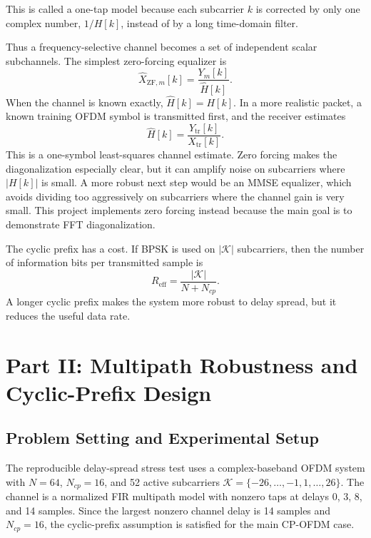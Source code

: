 \documentclass[conference]{IEEEtran}
\begin{document}
This is called a one-tap model because each subcarrier $k$ is corrected by only one complex number, $1/H[k]$, instead of by a long time-domain filter.

Thus a frequency-selective channel becomes a set of independent scalar subchannels. The simplest zero-forcing equalizer is
\begin{equation}
    \hat{X}_{\mathrm{ZF},m}[k]=\frac{Y_m[k]}{\hat{H}[k]}.
    \label{eq:zf}
\end{equation}
When the channel is known exactly, $\hat{H}[k]=H[k]$. In a more realistic packet, a known training OFDM symbol is transmitted first, and the receiver estimates
\begin{equation}
    \hat{H}[k]=\frac{Y_{\mathrm{tr}}[k]}{X_{\mathrm{tr}}[k]}.
    \label{eq:training}
\end{equation}
This is a one-symbol least-squares channel estimate. Zero forcing makes the diagonalization especially clear, but it can amplify noise on subcarriers where $|H[k]|$ is small. A more robust next step would be an MMSE equalizer, which avoids dividing too aggressively on subcarriers where the channel gain is very small. This project implements zero forcing instead because the main goal is to demonstrate FFT diagonalization. 

The cyclic prefix has a cost. If BPSK is used on $|\mathcal{K}|$ subcarriers, then the number of information bits per transmitted sample is
\begin{equation}
    R_{\mathrm{eff}}=\frac{|\mathcal{K}|}{N+N_{cp}}.
\end{equation}
A longer cyclic prefix makes the system more robust to delay spread, but it reduces the useful data rate.

\section{Part II: Multipath Robustness and Cyclic-Prefix Design}

\subsection{Problem Setting and Experimental Setup}
The reproducible delay-spread stress test uses a complex-baseband OFDM system with $N=64$, $N_{cp}=16$, and 52 active subcarriers $\mathcal{K}=\{-26,\ldots,-1,1,\ldots,26\}$. The channel is a normalized FIR multipath model with nonzero taps at delays 0, 3, 8, and 14 samples. Since the largest nonzero channel delay is 14 samples and $N_{cp}=16$, the cyclic-prefix assumption is satisfied for the main CP-OFDM case.
\end{document}
